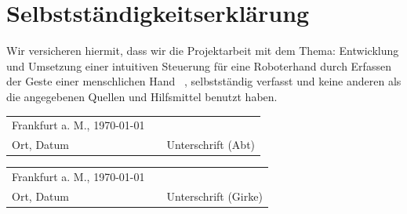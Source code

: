 \documentclass[a4paper,12pt,final]{article} %
\numberwithin{equation}{section} %
\numberwithin{figure}{section} %
\numberwithin{table}{section} %
\begin{document}
\section*{Selbstständigkeitserklärung}
Wir versicheren hiermit, dass wir die Projektarbeit mit dem Thema: \glqq Entwicklung und Umsetzung einer intuitiven Steuerung für eine Roboterhand durch Erfassen
der Geste einer menschlichen Hand \grqq\ , selbst\-ständ\-ig verfasst und keine anderen als die angegebenen Quellen und Hilfsmittel benutzt haben.\vspace{2.5cm}
\begin{longtable}{p{5.5cm} p{3cm} p{6cm}}
 Frankfurt a. M., \today& & \\
 \cline{1-1} \cline{3-3}
 Ort, Datum& &Unterschrift (Abt)\\
\end{longtable}
\vspace{0.5cm}
\begin{longtable}{p{5.5cm} p{3cm} p{6cm}}
 Frankfurt a. M., \today& & \\
 \cline{1-1} \cline{3-3}
 Ort, Datum& &Unterschrift (Girke)\\
\end{longtable}
\addtocounter{table}{-1} %
\newpage
\tableofcontents %
\newpage
{}  %
\listoffigures %
\newpage
{}
\end{document}

